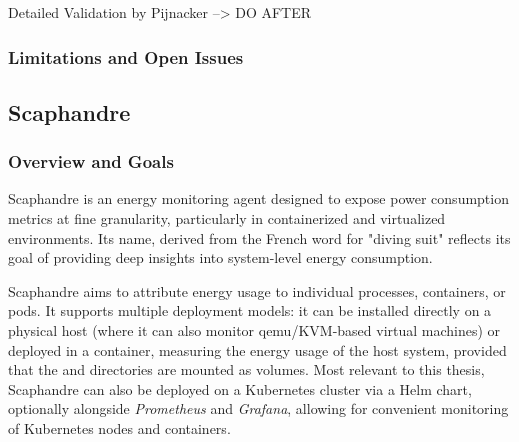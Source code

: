 Detailed Validation by Pijnacker\parencite{pijnackerEstimatingContainerlevelPower2024, pijnackerContainerlevelEnergyObservability2025}
--> DO AFTER

\subsubsection{Limitations and Open Issues}
\label{sec:kepler-limitations}




































\subsection{Scaphandre}
\label{sec:scaphandre}

\subsubsection{Overview and Goals}
\label{sec:scaphandre-overview}

Scaphandre\parencite{scaphandre_github} is an energy monitoring agent designed to expose power consumption metrics at fine granularity, particularly in containerized and virtualized environments. Its name, derived from the French word for "diving suit" reflects its goal of providing deep insights into system-level energy consumption.

Scaphandre aims to attribute energy usage to individual processes, containers, or pods. It supports multiple deployment models: it can be installed directly on a physical host (where it can also monitor qemu/KVM-based virtual machines) or deployed in a container, measuring the energy usage of the host system, provided that the  and  directories are mounted as volumes. Most relevant to this thesis, Scaphandre can also be deployed on a Kubernetes cluster via a Helm chart, optionally alongside \textit{Prometheus} and \textit{Grafana}, allowing for convenient monitoring of Kubernetes nodes and containers.

